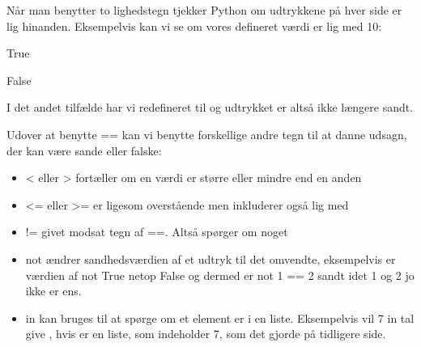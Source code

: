 \documentclass[letterpaper,10pt,english]{jupyterBook}
\begin{document}
Når man benytter to lighedstegn \sphinxcode{\sphinxupquote{==}} tjekker Python om udtrykkene på hver side er lig hinanden. Eksempelvis kan vi se om vores defineret værdi er lig med 10:


\begin{sphinxVerbatim}[commandchars=\\\{\}]
   
   
\end{sphinxVerbatim}

\begin{sphinxVerbatim}[commandchars=\\\{\}]
True
\end{sphinxVerbatim}

\begin{sphinxVerbatim}[commandchars=\\\{\}]
   
   
\end{sphinxVerbatim}

\begin{sphinxVerbatim}[commandchars=\\\{\}]
False
\end{sphinxVerbatim}

I det andet tilfælde har vi redefineret  til  og udtrykket er altså ikke længere sandt.

Udover at benytte == kan vi benytte forskellige andre tegn til at danne udsagn, der kan være sande eller falske:
\begin{itemize}
\item {} 
< eller > fortæller om en værdi er større eller mindre end en anden

\item {} 
<= eller >= er ligesom overstående men inkluderer også lig med

\item {} 
!= givet modsat tegn af ==. Altså spørger om noget 

\item {} 
not ændrer sandhedsværdien af et udtryk til det omvendte, eksempelvis er værdien af not True netop False og dermed er not 1 == 2 sandt idet 1 og 2 jo ikke er ens.

\item {} 
in kan bruges til at spørge om et element er i en liste. Eksempelvis vil 7 in tal give , hvis  er en liste, som indeholder 7, som det gjorde på tidligere side.

\end{itemize}
\end{document}
